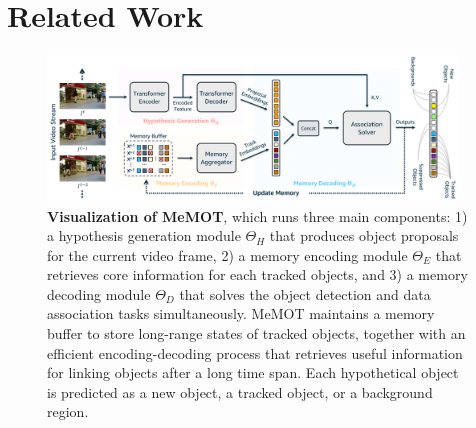 \section{Related Work}
\label{sec:related_work}

\begin{figure}[t!]
    \centering
    \includegraphics[width=0.97\textwidth]{figures/network.pdf}
    \vspace{-3.5mm}
    \caption{
        \textbf{Visualization of MeMOT}, which runs three main components: 1) a hypothesis generation module $\Theta_H$ that produces object proposals for the current video frame, 2) a memory encoding module $\Theta_E$ that retrieves core information for each tracked objects, and 3) a memory decoding module $\Theta_D$ that solves the object detection and data association tasks simultaneously.
        MeMOT maintains a memory buffer to store long-range states of tracked objects, together with an efficient encoding-decoding process that retrieves useful information for linking objects after a long time span.
        Each hypothetical object is predicted as a new object, a tracked object, or a background region.
    }
    \label{fig:network}
\end{figure}

